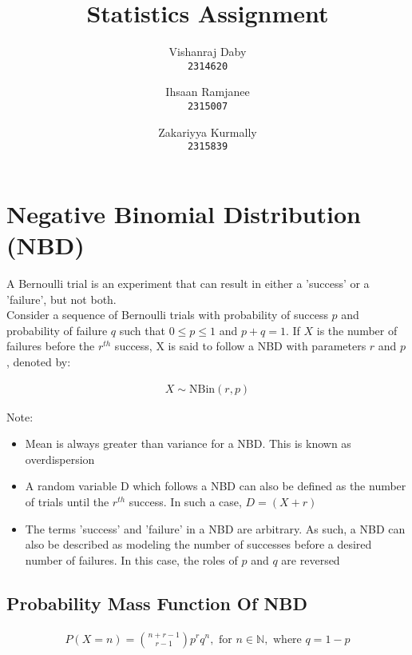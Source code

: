 \documentclass{article}
\author{
  Vishanraj Daby \\
  \texttt{2314620}
  \and
  Ihsaan Ramjanee \\
  \texttt{2315007}
  \and
  Zakariyya Kurmally \\
  \texttt{2315839}
}
\title{Statistics Assignment}
\begin{document}
\maketitle

\pagebreak

\tableofcontents

\pagebreak

\section{Negative Binomial Distribution (NBD)}
A Bernoulli trial is an experiment that can result in either a
'success' or a 'failure', but not both. \\

Consider a sequence of Bernoulli trials with probability of success
$ p $ and probability of failure $ q $ such that $ 0 \leq p \leq 1 $
and $ p + q = 1 $. If $ X $ is the number of failures before the
$ r^{th} $ success, X is said to follow a NBD with parameters $ r $
and $ p $, denoted by:

\begin{gather*}
  X \sim \text{NBin}(r, p)
\end{gather*}

Note:
\begin{itemize}
  \item Mean is always greater than variance for a NBD. This is 
    known as overdispersion
  \item A random variable D which follows a NBD can also be defined
    as the number of trials until the $ r^{th} $ success. In such a
    case, $ D = (X + r) $
  \item The terms 'success' and 'failure' in a NBD are arbitrary.
    As such, a NBD can also be described as modeling the number
    of successes before a desired number of failures. In this case,
    the roles of $p$ and $q$ are reversed
\end{itemize}


\subsection{Probability Mass Function Of NBD}

\begin{gather*}
  P(X = n) = {{n + r - 1} \choose {r - 1}} p^r q^n, 
  \text{ for } n \in \mathbb{N}, \text{ where } q = 1-p
\end{gather*}
\end{document}
